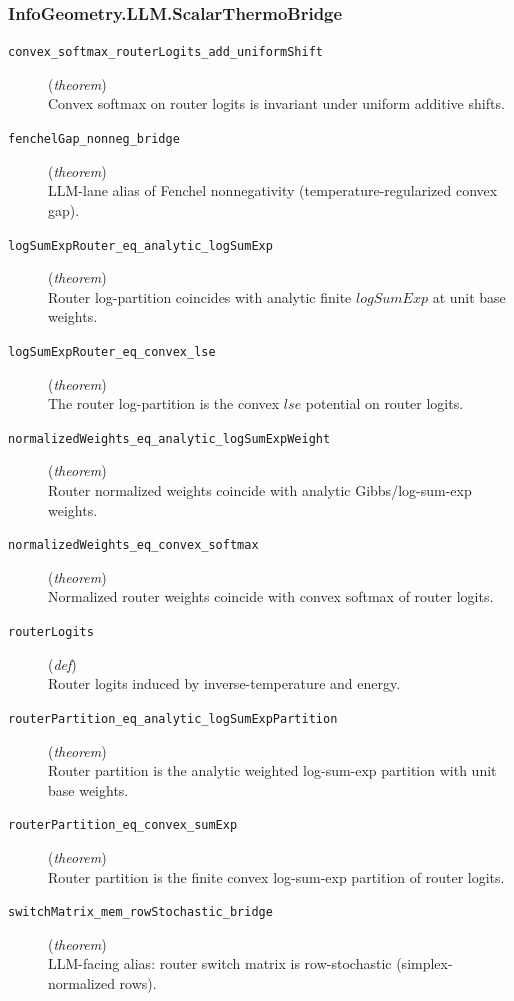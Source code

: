 \documentclass[11pt,a4paper]{article}
\begin{document}
\subsubsection*{InfoGeometry.LLM.ScalarThermoBridge}
\begin{description}
  \item[\texttt{convex\_softmax\_routerLogits\_add\_uniformShift}] (\textit{theorem}) \\ Convex softmax on router logits is invariant under uniform additive shifts.
  \item[\texttt{fenchelGap\_nonneg\_bridge}] (\textit{theorem}) \\ LLM-lane alias of Fenchel nonnegativity (temperature-regularized convex gap).
  \item[\texttt{logSumExpRouter\_eq\_analytic\_logSumExp}] (\textit{theorem}) \\ Router log-partition coincides with analytic finite $logSumExp$ at unit base weights.
  \item[\texttt{logSumExpRouter\_eq\_convex\_lse}] (\textit{theorem}) \\ The router log-partition is the convex $lse$ potential on router logits.
  \item[\texttt{normalizedWeights\_eq\_analytic\_logSumExpWeight}] (\textit{theorem}) \\ Router normalized weights coincide with analytic Gibbs/log-sum-exp weights.
  \item[\texttt{normalizedWeights\_eq\_convex\_softmax}] (\textit{theorem}) \\ Normalized router weights coincide with convex softmax of router logits.
  \item[\texttt{routerLogits}] (\textit{def}) \\ Router logits induced by inverse-temperature and energy.
  \item[\texttt{routerPartition\_eq\_analytic\_logSumExpPartition}] (\textit{theorem}) \\ Router partition is the analytic weighted log-sum-exp partition with unit base weights.
  \item[\texttt{routerPartition\_eq\_convex\_sumExp}] (\textit{theorem}) \\ Router partition is the finite convex log-sum-exp partition of router logits.
  \item[\texttt{switchMatrix\_mem\_rowStochastic\_bridge}] (\textit{theorem}) \\ LLM-facing alias: router switch matrix is row-stochastic (simplex-normalized rows).
\end{description}
\end{document}
